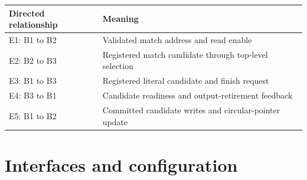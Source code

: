 \documentclass[11pt,a4paper]{article}
\begin{document}
{\small\renewcommand{\arraystretch}{1.18}\begin{longtable}{@{}L{0.24\textwidth}|L{0.7\textwidth}@{}}\toprule

\textbf{Directed relationship} & \textbf{Meaning}\\\midrule\endhead

E1: B1 to B2 & Validated match address and read enable\\[2pt]\hline

E2: B2 to B3 & Registered match candidate through top-level selection\\[2pt]\hline

E3: B1 to B3 & Registered literal candidate and finish request\\[2pt]\hline

E4: B3 to B1 & Candidate readiness and output-retirement feedback\\[2pt]\hline

E5: B1 to B2 & Committed candidate writes and circular-pointer update\\[2pt]\hline

\bottomrule\end{longtable}}

\section{Interfaces and configuration}
\end{document}
